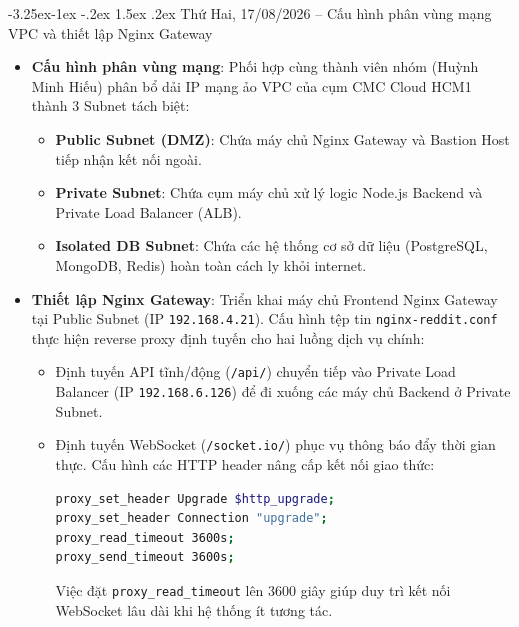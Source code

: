 \documentclass[12pt,a4paper]{article}
\makeatletter
\renewcommand\subsection{\@startsection{subsection}{2}{\z@}%
                                     {-3.25ex\@plus -1ex \@minus -.2ex}%
                                     {1.5ex \@plus .2ex}%
                                     {\normalfont\large\bfseries\color{cmcblue}}}
\makeatother
\begin{document}
\subsection{Thứ Hai, 17/08/2026 -- Cấu hình phân vùng mạng VPC và thiết lập Nginx Gateway}
\begin{itemize}
    \item \textbf{Cấu hình phân vùng mạng}: Phối hợp cùng thành viên nhóm (Huỳnh Minh Hiếu) phân bổ dải IP mạng ảo VPC của cụm CMC Cloud HCM1 thành 3 Subnet tách biệt:
    \begin{itemize}[nosep]
        \item \textbf{Public Subnet (DMZ)}: Chứa máy chủ Nginx Gateway và Bastion Host tiếp nhận kết nối ngoài.
        \item \textbf{Private Subnet}: Chứa cụm máy chủ xử lý logic Node.js Backend và Private Load Balancer (ALB).
        \item \textbf{Isolated DB Subnet}: Chứa các hệ thống cơ sở dữ liệu (PostgreSQL, MongoDB, Redis) hoàn toàn cách ly khỏi internet.
    \end{itemize}
    \item \textbf{Thiết lập Nginx Gateway}: Triển khai máy chủ Frontend Nginx Gateway tại Public Subnet (IP \texttt{192.168.4.21}). Cấu hình tệp tin \texttt{nginx-reddit.conf} thực hiện reverse proxy định tuyến cho hai luồng dịch vụ chính:
    \begin{itemize}[nosep]
        \item Định tuyến API tĩnh/động (\texttt{/api/}) chuyển tiếp vào Private Load Balancer (IP \texttt{192.168.6.126}) để đi xuống các máy chủ Backend ở Private Subnet.
        \item Định tuyến WebSocket (\texttt{/socket.io/}) phục vụ thông báo đẩy thời gian thực. Cấu hình các HTTP header nâng cấp kết nối giao thức:
\begin{lstlisting}[language=bash]
proxy_set_header Upgrade $http_upgrade;
proxy_set_header Connection "upgrade";
proxy_read_timeout 3600s;
proxy_send_timeout 3600s;
\end{lstlisting}
        Việc đặt \texttt{proxy\_read\_timeout} lên 3600 giây giúp duy trì kết nối WebSocket lâu dài khi hệ thống ít tương tác.
    \end{itemize}
\end{itemize}
\end{document}
